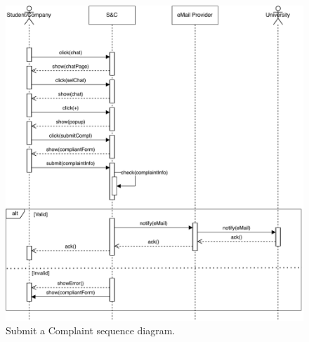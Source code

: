 \begin{figure}[H]
    \begin{center}
        \includegraphics[width=\linewidth]{Images/SequenceDiagram/SubmitComplaintSD.pdf}
        \caption{Submit a Complaint sequence diagram.}
        \label{fig:submit_complaint_seqdiag}%
    \end{center}
\end{figure}

\newpage

